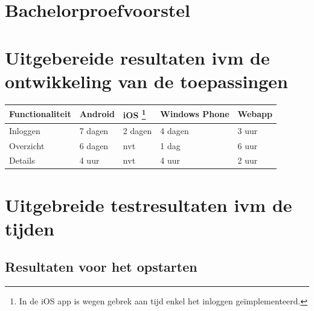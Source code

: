 \documentclass[pdftex,a4paper,12pt,twoside]{report}
\begin{document}
\tableofcontents

\appendix

\chapter{Bachelorproefvoorstel}



\chapter{Uitgebereide resultaten ivm de ontwikkeling van de toepassingen}
\label{ch:uitgebereideresultatenmetbetrekkingtotontwikkeling}
\begin{center}
  \begin{tabular}{ | l | l | l | l | l |}
    \hline
    Functionaliteit & Android & iOS \footnote{In de iOS app is wegen gebrek aan tijd enkel het inloggen geïmplementeerd.} & Windows Phone & Webapp
    \\ \hline
    Inloggen & 7 dagen & 2 dagen & 4 dagen & 3 uur
    \\ \hline
    Overzicht & 6 dagen & nvt & 1 dag & 6 uur
    \\ \hline
    Details & 4 uur & nvt & 4 uur & 2 uur
    \\ \hline
  \end{tabular}
\end{center}


\chapter{Uitgebreide testresultaten ivm de tijden}
\label{ch:uitgebereidresultatenmetbetrekkingtottijden}

\section{Resultaten voor het opstarten}
\end{document}
